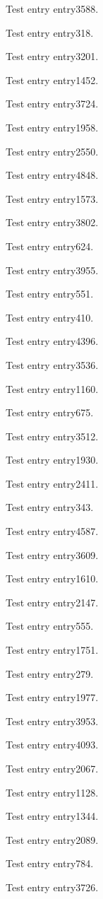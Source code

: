Test entry \gls{entry3588}.

Test entry \gls{entry318}.

Test entry \gls{entry3201}.

Test entry \gls{entry1452}.

Test entry \gls{entry3724}.

Test entry \gls{entry1958}.

Test entry \gls{entry2550}.

Test entry \gls{entry4848}.

Test entry \gls{entry1573}.

Test entry \gls{entry3802}.

Test entry \gls{entry624}.

Test entry \gls{entry3955}.

Test entry \gls{entry551}.

Test entry \gls{entry410}.

Test entry \gls{entry4396}.

Test entry \gls{entry3536}.

Test entry \gls{entry1160}.

Test entry \gls{entry675}.

Test entry \gls{entry3512}.

Test entry \gls{entry1930}.

Test entry \gls{entry2411}.

Test entry \gls{entry343}.

Test entry \gls{entry4587}.

Test entry \gls{entry3609}.

Test entry \gls{entry1610}.

Test entry \gls{entry2147}.

Test entry \gls{entry555}.

Test entry \gls{entry1751}.

Test entry \gls{entry279}.

Test entry \gls{entry1977}.

Test entry \gls{entry3953}.

Test entry \gls{entry4093}.

Test entry \gls{entry2067}.

Test entry \gls{entry1128}.

Test entry \gls{entry1344}.

Test entry \gls{entry2089}.

Test entry \gls{entry784}.

Test entry \gls{entry3726}.

